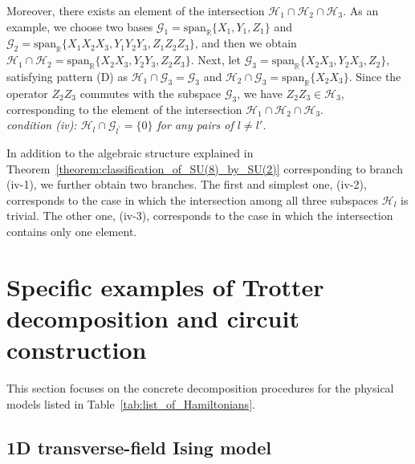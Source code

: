 \documentclass[aps,showpacs,amsmath,amssymb,twocolumn,prx,longbibliography,superscriptaddress,notitlepage,floatfix,10pt]{revtex4-2}
\begin{document}
Moreover, there exists an element of the intersection $\mathcal{H}_{1} \cap \mathcal{H}_{2} \cap \mathcal{H}_{3}$. As an example, we choose two bases $\mathcal{G}_{1} = \mathrm{span}_{\mathbb{R}}\{X_{1}, Y_{1}, Z_{1}\}$ and $\mathcal{G}_{2} = \mathrm{span}_{\mathbb{R}}\{X_{1}X_{2}X_{3}, Y_{1}Y_{2}Y_{3}, Z_{1}Z_{2}Z_{3}\}$, and then we obtain $\mathcal{H}_{1} \cap \mathcal{H}_{2} = \mathrm{span}_{\mathbb{R}}\{X_{2}X_{3}, Y_{2}Y_{3}, Z_{2}Z_{3}\}$. Next, let $\mathcal{G}_{3} = \mathrm{span}_{\mathbb{R}}\{X_{2}X_{3}, Y_{2}X_{3}, Z_{2}\}$, satisfying pattern (D) as $\mathcal{H}_{1} \cap \mathcal{G}_{3} = \mathcal{G}_{3}$ and $\mathcal{H}_{2} \cap \mathcal{G}_{3} = \mathrm{span}_{\mathbb{R}}\{X_{2}X_{3}\}$. Since the operator $Z_{2}Z_{3}$ commutes with the subspace $\mathcal{G}_{3}$, we have $Z_{2}Z_{3} \in \mathcal{H}_{3}$, corresponding to the element of the intersection $\mathcal{H}_{1} \cap \mathcal{H}_{2} \cap \mathcal{H}_{3}$.\\

{\it condition (iv): $\mathcal{H}_{l}\cap\mathcal{G}_{l^{\prime}}=\{0\}$ for any pairs of $l\neq l'$.}

In addition to the algebraic structure explained in Theorem~\ref{theorem:classification_of_SU(8)_by_SU(2)} corresponding to branch (iv-1), we further obtain two branches. The first and simplest one, (iv-2), corresponds to the case in which the intersection among all three subspaces $\mathcal{H}_{l}$ is trivial. The other one, (iv-3), corresponds to the case in which the intersection contains only one element.



\section{Specific examples of Trotter decomposition and circuit construction\label{appendix:examples}}


This section focuses on the concrete decomposition procedures for the physical models listed in Table~\ref{tab:list_of_Hamiltonians}. 


\subsection{1D transverse-field Ising model}
\end{document}
